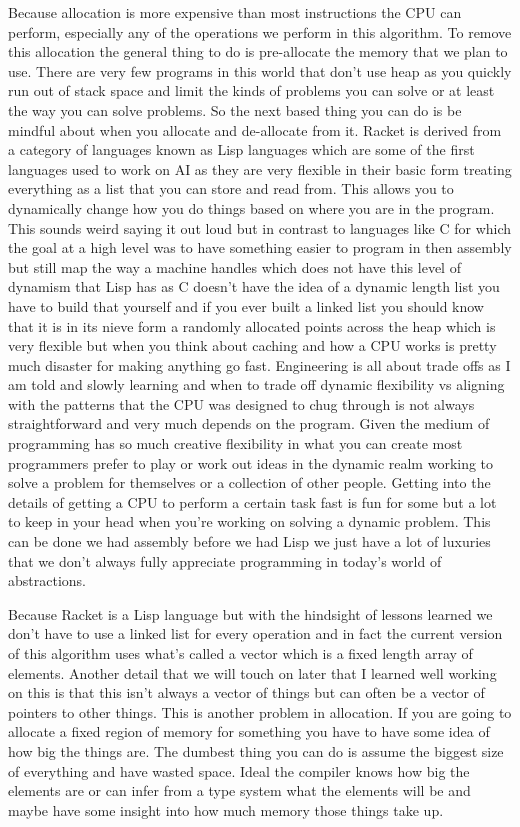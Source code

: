 \documentclass{article}
\begin{document}
Because allocation is more expensive than most instructions the CPU can perform, especially any of the operations we perform in this algorithm. To remove this allocation the general thing to do is pre-allocate the memory that we plan to use. There are very few programs in this world that don’t use heap as you quickly run out of stack space and limit the kinds of problems you can solve or at least the way you can solve problems. So the next based thing you can do is be mindful about when you allocate and de-allocate from it. 
Racket is derived from a category of languages known as Lisp languages which are some of the first languages used to work on AI as they are very flexible in their basic form treating everything as a list that you can store and read from. This allows you to dynamically change how you do things based on where you are in the program. This sounds weird saying it out loud but in contrast to languages like C for which the goal at a high level was to have something easier to program in then assembly but still map the way a machine handles which does not have this level of dynamism that Lisp has as C doesn’t have the idea of a dynamic length list you have to build that yourself and if you ever built a linked list you should know that it is in its nieve form a randomly allocated points across the heap which is very flexible but when you think about caching and how a CPU works is pretty much disaster for making anything go fast. Engineering is all about trade offs as I am told and slowly learning and when to trade off dynamic flexibility vs aligning with the patterns that the CPU was designed to chug through is not always straightforward and very much depends on the program. Given the medium of programming has so much creative flexibility in what you can create most programmers prefer to play or work out ideas in the dynamic realm working to solve a problem for themselves or a collection of other people. Getting into the details of getting a CPU to perform a certain task fast is fun for some but a lot to keep in your head when you're working on solving a dynamic problem. This can be done we had assembly before we had Lisp we just have a lot of luxuries that we don’t always fully appreciate programming in today's world of abstractions.

Because Racket is a Lisp language but with the hindsight of lessons learned we don’t have to use a linked list for every operation and in fact the current version of this algorithm uses what's called a vector which is a fixed length array of elements. Another detail that we will touch on later that I learned well working on this is that this isn’t always a vector of things but can often be a vector of pointers to other things. This is another problem in allocation. If you are going to allocate a fixed region of memory for something you have to have some idea of how big the things are. The dumbest thing you can do is assume the biggest size of everything and have wasted space. Ideal the compiler knows how big the elements are or can infer from a type system what the elements will be and maybe have some insight into how much memory those things take up. 
\end{document}
